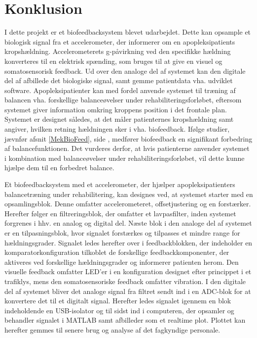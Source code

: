 \section{Konklusion}
I dette projekt er et biofeedbacksystem blevet udarbejdet. Dette kan opsample et biologisk signal fra et accelerometer, der informerer om en apopleksipatients kropshældning. Accelerometerets g-påvirkning ved den specifikke hældning konverteres til en elektrisk spænding, som bruges til at give en visuel og somatosensorisk feedback. Ud over den analoge del af systemet kan den digitale del af afbillede det biologiske signal, samt gemme patientdata vha. udviklet software. Apopleksipatienter kan med fordel anvende systemet til træning af balancen vha. forskellige balanceøvelser under rehabiliteringsforløbet, eftersom systemet giver information omkring kroppens position i det frontale plan. Systemet er designet således, at det måler patienternes kropshældning samt angiver, hvilken retning hældningen sker i vha. biofeedback. Ifølge studier, jævnfør afsnit \ref{MekBioFeed}, side \pageref{MekBioFeed}, medfører biofeedback en signifikant forbedring af balancefunktionen. Det vurderes derfor, at hvis patienterne anvender systemet i kombination med balanceøvelser under rehabiliteringsforløbet, vil dette kunne hjælpe dem til en forbedret balance. 

Et biofeedbacksystem med et accelerometer, der hjælper apopleksipatienters balancetræning under rehabilitering, kan designes ved, at systemet starter med en opsamlingsblok. Denne omfatter accelerometeret, offsetjustering og en forstærker. Herefter følger en filtreringsblok, der omfatter et lavpasfilter, inden systemet forgrenes i hhv. en analog og digital del. Næste blok i den analoge del af systemet er en tilpasningsblok, hvor signalet forstærkes og tilpasses et mindre range for hældningsgrader. Signalet ledes herefter over i feedbackblokken, der indeholder en komparatorkonfiguration tilkoblet de forskellige feedbackkomponenter, der aktiveres ved forskellige hældningsgrader og informerer patienten herom. Den visuelle feedback omfatter LED'er i en konfiguration designet efter princippet i et trafiklys, mens den somatosensoriske feedback omfatter vibration. 
I den digitale del af systemet bliver det analoge signal fra filtret sendt ind i en ADC-blok for at konvertere det til et digitalt signal. Herefter ledes signalet igennem en blok indeholdende en USB-isolator og til sidst ind i computeren, der opsamler og behandler signalet i MATLAB samt afbilleder som et realtime plot. Plottet kan herefter gemmes til senere brug og analyse af det fagkyndige personale.

